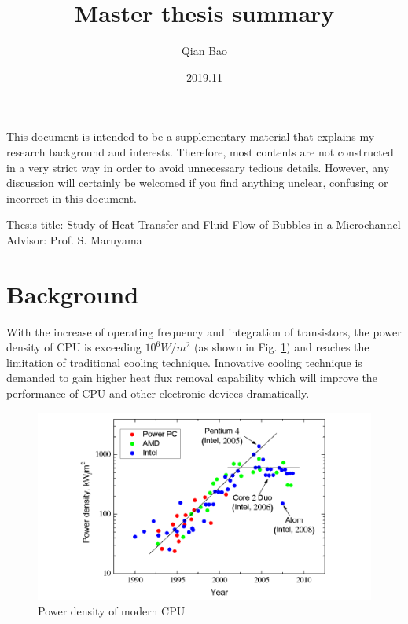 \documentclass[a4,14pt]{extarticle}
\begin{document}
\pretitle{\begin{flushright}\LARGE}
\posttitle{\par\end{flushright}\vskip 0.5em}
\preauthor{\begin{flushright}\large \lineskip 0.5em}
\postauthor{\par\end{flushright}}
\predate{\begin{flushright}\large}
\postdate{\par\end{flushright}}

\title{\huge Master thesis summary}
\author{Qian Bao}
\date{2019.11}
\maketitle

This document is intended to be a supplementary material that explains
my research background and interests. Therefore, most contents are not constructed in a
very strict way in order to avoid unnecessary tedious details. However, any
discussion will certainly be welcomed if you find anything unclear, confusing or incorrect
 in this document.


\begin{center}
\large{Thesis title: Study of Heat Transfer and Fluid Flow of Bubbles in a Microchannel} \\
\large{Advisor: Prof. S. Maruyama} \\
\end{center}


\section{Background}

With the increase of operating frequency and integration of transistors, the power
density of CPU is exceeding $10^6W/m^2$ (as shown in Fig. \ref{fig:cpu}) and reaches the limitation of traditional cooling
technique. Innovative cooling technique is demanded to gain higher heat flux removal
capability which will improve the performance of CPU and other electronic devices
dramatically.

\begin{figure}[h]
  \centering
  \includegraphics[width=13cm]{cpu_heat_flux.png}
  \caption{Power density of modern CPU \cite{okajima}}
  \label{fig:cpu}
\end{figure}
\end{document}

